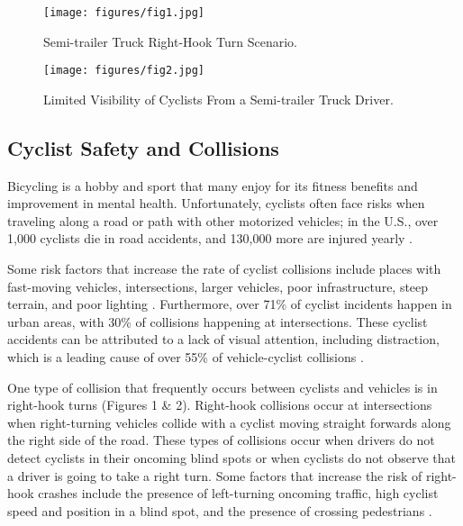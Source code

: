\documentclass{article}
\begin{document}
\begin{figure}[b]
  \centering
  \texttt{[image: figures/fig1.jpg]}
  \caption{Semi-trailer Truck Right-Hook Turn Scenario.}
  \label{fig:fig1}
\end{figure}


\begin{figure}[b]
\centering
\texttt{[image: figures/fig2.jpg]}
\caption{Limited Visibility of Cyclists From a Semi-trailer Truck Driver.}
\label{fig:fig2}
\end{figure}

\subsection{Cyclist Safety and Collisions}
Bicycling is a hobby and sport that many enjoy for its fitness benefits and improvement in mental health. Unfortunately, cyclists often face risks when traveling along a road or path with other motorized vehicles; in the U.S., over 1,000 cyclists die in road accidents, and 130,000 more are injured yearly \cite{noauthor_bicycle_2022}. 

Some risk factors that increase the rate of cyclist collisions include places with fast-moving vehicles, intersections, larger vehicles, poor infrastructure, steep terrain, and poor lighting \cite{carvajal_bicycle_2020}. Furthermore, over 71\% of cyclist incidents happen in urban areas, with 30\% of collisions happening at intersections. These cyclist accidents can be attributed to a lack of visual attention, including distraction, which is a leading cause of over 55\% of vehicle-cyclist collisions \cite{jannat_right-hook_2020}. 

One type of collision that frequently occurs between cyclists and vehicles is in right-hook turns (Figures 1 \& 2). Right-hook collisions occur at intersections when right-turning vehicles collide with a cyclist moving straight forwards along the right side of the road. These types of collisions occur when drivers do not detect cyclists in their oncoming blind spots or when cyclists do not observe that a driver is going to take a right turn. Some factors that increase the risk of right-hook crashes include the presence of left-turning oncoming traffic, high cyclist speed and position in a blind spot, and the presence of crossing pedestrians \cite{jannat_right-hook_2020}. 
\end{document}

